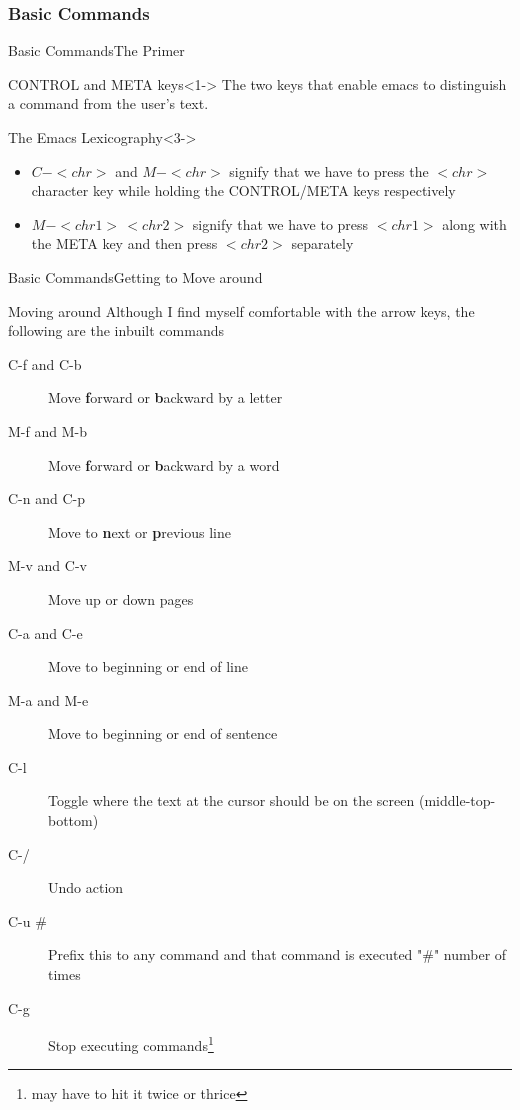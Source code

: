 \documentclass{beamer}
\begin{document}
\subsubsection{Basic Commands}
\begin{frame}{Basic Commands}{The Primer}
\begin{block}{CONTROL and META keys}<1->
The two keys that enable emacs to distinguish a command from the user's text. 
\end{block}
\begin{block}{The Emacs Lexicography}<3->
\begin{itemize}
\item<4->{$C-<chr>$ and $M-<chr>$ signify that we have to press the $<chr>$ character key while holding the CONTROL/META keys respectively}
\item<5->{$M-<chr1>\,<chr2>$ signify that we have to press $<chr1>$ along with the META key and then press $<chr2>$ separately}
\end{itemize}
\end{block}
\end{frame}

\begin{frame}{Basic Commands}{Getting to Move around}
\begin{block}{Moving around}
Although I find myself comfortable with the arrow keys, the following are the inbuilt commands
\end{block}
\begin{description}
\item[C-f and C-b] Move \textbf{f}orward or \textbf{b}ackward by a letter
\pause
\item[M-f and M-b] Move \textbf{f}orward or \textbf{b}ackward by a word
\pause
\item[C-n and C-p] Move to \textbf{n}ext or \textbf{p}revious line
\pause
\item[M-v and C-v] Move up or down pages
\pause
\item[C-a and C-e] Move to beginning or end of line
\pause
\item[M-a and M-e] Move to beginning or end of sentence
\pause
\item[C-l] Toggle where the text at the cursor should be on the screen (middle-top-bottom)
\pause
\item[C-/] Undo action
\pause
\item[C-u \#] Prefix this to any command and that command is executed "\#" number of times
\pause
\item[C-g] Stop executing commands\footnote{may have to hit it twice or thrice}
\end{description}
\end{frame}
\end{document}
